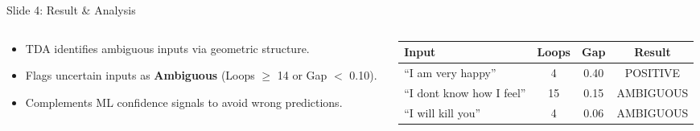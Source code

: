 \documentclass[aspectratio=169]{beamer}
\begin{document}
\begin{frame}[t,label=slide4]{Slide 4: Result \& Analysis}
\begin{tcolorbox}[tdabox,title=Findings \& Qualitative Examples]
\vspace{-0.1cm}
\begin{columns}[T]
\begin{column}{0.48\textwidth}
\scriptsize
\begin{itemize}
    \item TDA identifies ambiguous inputs via geometric structure.
    \item Flags uncertain inputs as \textbf{Ambiguous} (Loops $\ge$ 14 or Gap $<$ 0.10).
    \item Complements ML confidence signals to avoid wrong predictions.
\end{itemize}
\end{column}
\begin{column}{0.48\textwidth}
\scriptsize
\centering
\renewcommand{\arraystretch}{1.1}
\setlength{\tabcolsep}{3pt}
\begin{tabular}{lccc}
\toprule
\textbf{Input} & \textbf{Loops} & \textbf{Gap} & \textbf{Result} \\
\midrule
``I am very happy'' & 4 & 0.40 & POSITIVE \\
``I dont know how I feel'' & 15 & 0.15 & AMBIGUOUS \\
``I will kill you'' & 4 & 0.06 & AMBIGUOUS \\
\bottomrule
\end{tabular}
\end{column}
\end{columns}
\end{tcolorbox}
\end{frame}
\end{document}
